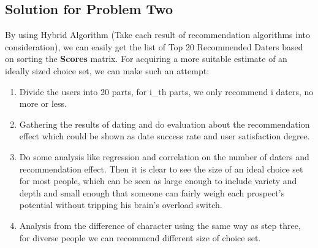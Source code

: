 \subsection{Solution for Problem Two}
By using Hybrid Algorithm (Take each result of recommendation algorithms into consideration), we can easily get the list of Top 20 Recommended Daters based on sorting the \textbf{Scores} matrix. For acquiring a more suitable estimate of an ideally sized choice set, we can make such an attempt: 
\begin{enumerate}
	\item Divide the users into 20 parts, for i\_th parts, we only recommend i daters, no more or less. 
	\item Gathering the results of dating and do evaluation about the recommendation effect which could be shown as date success rate and user satisfaction degree. 
	\item Do some analysis like regression and correlation on the number of daters and recommendation effect. Then it is clear to see the size of an ideal choice set for most people, which can be seen as large enough to include variety and depth and small enough that someone can fairly weigh each prospect’s potential without tripping his brain’s overload switch. 
	\item Analysis from the difference of character using the same way as step three, for diverse people we can recommend different size of choice set.
\end{enumerate}


